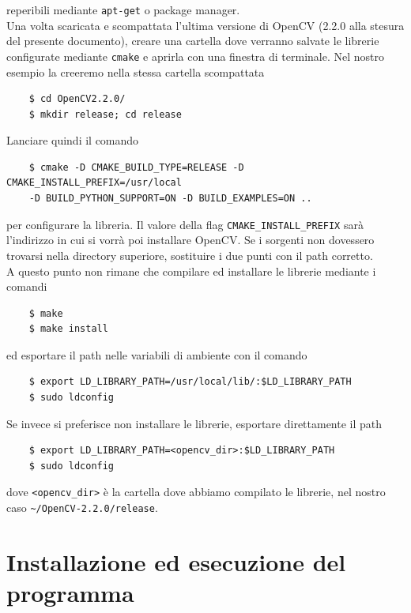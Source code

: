 \documentclass[12pt]{report}
\begin{document}
\noindent reperibili mediante \verb|apt-get| o package manager.\\

\noindent Una volta scaricata e scompattata l'ultima versione di OpenCV (2.2.0 alla stesura del presente documento), creare una cartella dove verranno salvate le librerie configurate mediante \verb|cmake| e aprirla con una finestra di terminale. Nel nostro esempio la creeremo nella stessa cartella scompattata

\begin{verbatim}
	$ cd OpenCV2.2.0/
	$ mkdir release; cd release
\end{verbatim}

\noindent Lanciare quindi il comando

\begin{verbatim}
	$ cmake -D CMAKE_BUILD_TYPE=RELEASE -D CMAKE_INSTALL_PREFIX=/usr/local
	-D BUILD_PYTHON_SUPPORT=ON -D BUILD_EXAMPLES=ON ..
\end{verbatim}

\noindent per configurare la libreria. Il valore della flag \verb|CMAKE_INSTALL_PREFIX| sar\`a l'indirizzo in cui si vorr\`a poi installare OpenCV. Se i sorgenti non dovessero trovarsi nella directory superiore, sostituire i due punti con il path corretto.\\

\noindent A questo punto non rimane che compilare ed installare le librerie mediante i comandi

\begin{verbatim}
	$ make
	$ make install
\end{verbatim}

\noindent ed esportare il path nelle variabili di ambiente con il comando

\begin{verbatim}
	$ export LD_LIBRARY_PATH=/usr/local/lib/:$LD_LIBRARY_PATH
	$ sudo ldconfig
\end{verbatim}

\noindent Se invece si preferisce non installare le librerie, esportare direttamente il path 

\begin{verbatim}
	$ export LD_LIBRARY_PATH=<opencv_dir>:$LD_LIBRARY_PATH
	$ sudo ldconfig
\end{verbatim}

\noindent dove \verb|<opencv_dir>| \`e la cartella dove abbiamo compilato le librerie, nel nostro caso \verb|~/OpenCV-2.2.0/release|.

\section{Installazione ed esecuzione del programma}
\end{document}
